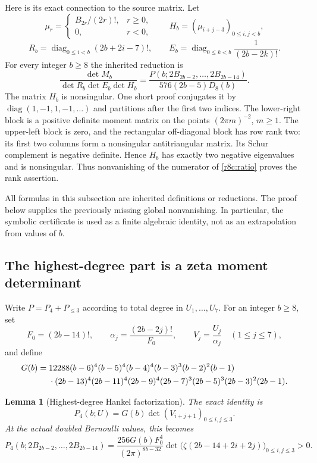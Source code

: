 \documentclass[11pt,a4paper]{article}
\numberwithin{equation}{section}
\theoremstyle{plain}
\newtheorem{lemma}[theorem]{Lemma}
\theoremstyle{definition}
\theoremstyle{remark}
\begin{document}
Here is its exact connection to the source matrix. Let
\[
 \mu_r=\begin{cases}B_{2r}/(2r)!,&r\ge0,\\0,&r<0,\end{cases}
 \qquad H_b=(\mu_{i+j-3})_{0\le i,j<b},
\]
\[
 R_b=\operatorname{diag}_{0\le i<b}(2b+2i-7)!,\qquad
 E_b=\operatorname{diag}_{0\le k<b}\frac1{(2b-2k)!}.
\]
For every integer $b\ge8$ the inherited reduction is
\begin{equation}\label{r8c:ratio}
 \frac{\det M_b}{\det R_b\det E_b\det H_b}
 =\frac{P(b;2B_{2b-2},\ldots,2B_{2b-14})}
 {576(2b-5)D_8(b)}.
\end{equation}
The matrix $H_b$ is nonsingular. One short proof conjugates it by
$\operatorname{diag}(1,-1,1,-1,\ldots)$ and partitions after the
first two indices. The lower-right block is a positive definite
moment matrix on the points $(2\pi m)^{-2}$, $m\ge1$. The
upper-left block is zero, and the rectangular off-diagonal block
has row rank two: its first two columns form a nonsingular
antitriangular matrix. Its Schur complement is negative definite.
Hence $H_b$ has exactly two negative eigenvalues and is nonsingular.
Thus nonvanishing of the numerator of \eqref{r8c:ratio} proves the
rank assertion.

All formulas in this subsection are inherited definitions or
reductions. The proof below supplies the previously missing global
nonvanishing. In particular, the symbolic certificate is used as a
finite algebraic identity, not as an extrapolation from values of $b$.

\subsection{The highest-degree part is a zeta moment determinant}

Write $P=P_4+P_{\le3}$ according to total degree in $U_1,\ldots,U_7$.
For an integer $b\ge8$, set
\[
 F_0=(2b-14)!,\qquad
 \alpha_j=\frac{(2b-2j)!}{F_0},\qquad V_j=\frac{U_j}{\alpha_j}
       \quad(1\le j\le7),
\]
and define
\begin{align}
 G(b)={}&12288(b-6)^4(b-5)^4(b-4)^4(b-3)^3(b-2)^2(b-1)
 \notag\\
 &\cdot(2b-13)^4(2b-11)^4(2b-9)^4(2b-7)^3
 (2b-5)^3(2b-3)^2(2b-1).
 \label{r8c:G}
\end{align}

\begin{lemma}[Highest-degree Hankel factorization]\label{r8c:hankel}
The exact identity is
\begin{equation}\label{r8c:P4}
 P_4(b;U)=G(b)\det(V_{i+j+1})_{0\le i,j\le3}.
\end{equation}
At the actual doubled Bernoulli values, this becomes
\begin{equation}\label{r8c:P4zeta}
 P_4(b;2B_{2b-2},\ldots,2B_{2b-14})
 =\frac{256G(b)F_0^4}{(2\pi)^{8b-32}}
       \det\bigl(\zeta(2b-14+2i+2j)\bigr)_{0\le i,j\le3}>0.
\end{equation}
\end{lemma}
\end{document}
